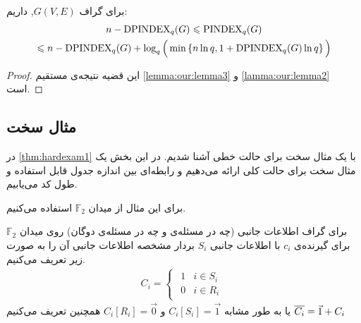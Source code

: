\begin{theorem}
	\label{thm:ourmain}
	برای گراف
	$G(V,E)$,
	داریم:
	\begin{multline}
		n - \mathrm{DPINDEX}_q(G) \leqslant \mathrm{PINDEX}_q(G) \\ \leqslant n -\mathrm{DPINDEX}_q(G) + \log_q\Big(\min\left\{ n\ln q, 1+ \mathrm{DPINDEX}_q(G)\ln q  \right\}\Big)
	\end{multline}
\end{theorem}
\begin{proof}
	این قضیه نتیجه‌ی مستقیم
	\autoref{lemma:our:lemma3}
	و
	\autoref{lamma:our:lemma2}
	است.
\end{proof}

\subsection{
	مثال سخت
}
در 
\autoref{thm:hardexam1}
با یک مثال سخت برای حالت خطی آشنا شدیم. در این بخش یک مثال سخت برای حالت کلی ارائه می‌دهیم و رابطه‌ای بین اندازه جدول قابل استفاده و طول کد می‌یابیم.

برای این مثال از میدان 
$\mathbb{F}_2$
استفاده می‌کنیم.

\begin{definition}
	برای گراف اطلاعات جانبی (چه در مسئله‌ی
	\picod
	و چه در مسئله‌ی دوگان) روی میدان
	$\mathbb{F}_2$
	برای گیرنده‌ی 
	$c_i$
	با اطلاعات جانبی
	$S_i$
	بردار مشخصه اطلاعات جانبی آن را به صورت زیر تعریف می‌کنیم.
	\begin{align}
		C_i =
		\begin{cases}
			\begin{array}{ll}
			1 & i \in S_i \\
			0 &  i \in R_i
		\end{array}
		\end{cases}
	\end{align}
	یا به طور مشابه
	$C_i[S_i] = \vec{1}$
	و
	$ C_i[R_i] = \vec{0}$
	همچنین تعریف می‌کنیم
	$\overline{C_i} = \vec{1} + C_i$
\end{definition}


